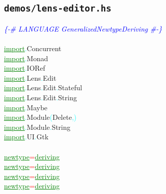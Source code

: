 \subsection{\texttt{demos/lens-editor.hs}}
\label{mod:lens-editor}
\textcolor{blue}{{\it{}\{-\# LANGUAGE GeneralizedNewtypeDeriving \#-\}}}\\\\\textcolor{green}{\underline{import}}\textcolor{cyan}{.}{\rm{}Concurrent}\\\textcolor{green}{\underline{import}}\textcolor{cyan}{.}{\rm{}Monad}\\\textcolor{green}{\underline{import}}\textcolor{cyan}{.}{\rm{}IORef}\\\textcolor{green}{\underline{import}}\textcolor{cyan}{.}{\rm{}Lens}\textcolor{cyan}{.}{\rm{}Edit}\\\textcolor{green}{\underline{import}}\textcolor{cyan}{.}{\rm{}Lens}\textcolor{cyan}{.}{\rm{}Edit}\textcolor{cyan}{.}{\rm{}Stateful}\\\textcolor{green}{\underline{import}}\textcolor{cyan}{.}{\rm{}Lens}\textcolor{cyan}{.}{\rm{}Edit}\textcolor{cyan}{.}{\rm{}String}\\\textcolor{green}{\underline{import}}\textcolor{cyan}{.}{\rm{}Maybe}\\\textcolor{green}{\underline{import}}\textcolor{cyan}{.}{\rm{}Module}\hsspace \textcolor{cyan}{(}{\rm{}Delete}\textcolor{cyan}{,}\textcolor{cyan}{)}\\\textcolor{green}{\underline{import}}\textcolor{cyan}{.}{\rm{}Module}\textcolor{cyan}{.}{\rm{}String}\\\textcolor{green}{\underline{import}}\textcolor{cyan}{.}{\rm{}UI}\textcolor{cyan}{.}{\rm{}Gtk}\\\\\textcolor{green}{\underline{newtype}}\hsspace \hsspace \hsspace \hsspace \hsspace \hsspace \textcolor{red}{=}\hsspace \hsspace \hsspace \hsspace \hsspace \hsspace {\rm{}()}\hsspace \textcolor{green}{\underline{deriving}}\\\textcolor{green}{\underline{newtype}}\hsspace \hsspace \hsspace \textcolor{red}{=}\hsspace \hsspace \hsspace {\rm{}()}\hsspace \textcolor{green}{\underline{deriving}}\\\textcolor{green}{\underline{newtype}}\hsspace \hsspace \hsspace \hsspace \hsspace \textcolor{red}{=}\hsspace \hsspace \hsspace \hsspace \hsspace {\rm{}()}\hsspace \textcolor{green}{\underline{deriving}}\\\textcolor{green}{\underline{newtype}}\hsspace \textcolor{red}{=}\hsspace {\rm{}()}\hsspace \textcolor{green}{\underline{deriving}}\hsspace 